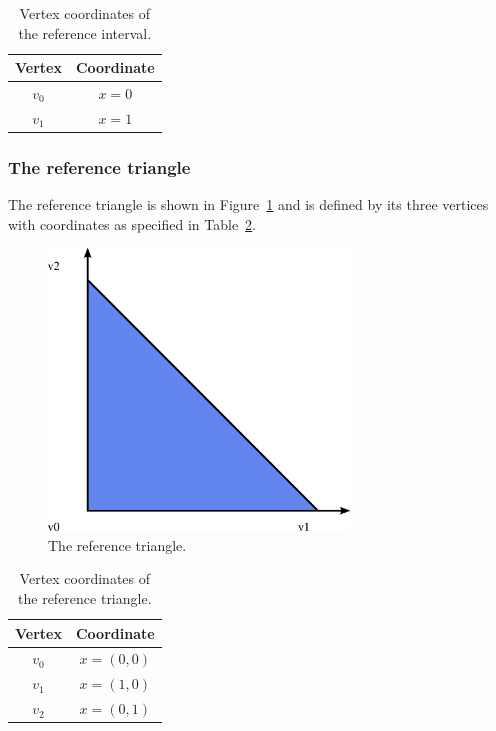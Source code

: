 \begin{table}
\linespread{1.2}\selectfont
  \begin{center}
    \begin{tabular}{|c|c|}
      \hline
      Vertex & Coordinate \\
      \hline
      \hline
      $v_0$ & $x = 0$ \\
      \hline
      $v_1$ & $x = 1$ \\
      \hline
    \end{tabular}
    \caption{Vertex coordinates of the reference interval.}
    \label{tab:interval,vertices}
  \end{center}
\end{table}

\subsubsection{The reference triangle}

The reference triangle is shown in Figure~\ref{fig:triangle} and is
defined by its three vertices with coordinates as specified in
Table~\ref{tab:triangle,vertices}.

\begin{figure}
  \begin{center}
    \includegraphics[width=8cm]{chapters/alnes-2/eps/triangle.eps}
    \caption{The reference triangle.}
    \label{fig:triangle}
  \end{center}
\end{figure}

\begin{table}
\linespread{1.2}\selectfont
  \begin{center}
    \begin{tabular}{|c|c|}
      \hline
      Vertex & Coordinate \\
      \hline
      \hline
      $v_0$ & $x = (0, 0)$ \\
      \hline
      $v_1$ & $x = (1, 0)$ \\
      \hline
      $v_2$ & $x = (0, 1)$ \\
      \hline
    \end{tabular}
    \caption{Vertex coordinates of the reference triangle.}
    \label{tab:triangle,vertices}
  \end{center}
\end{table}

